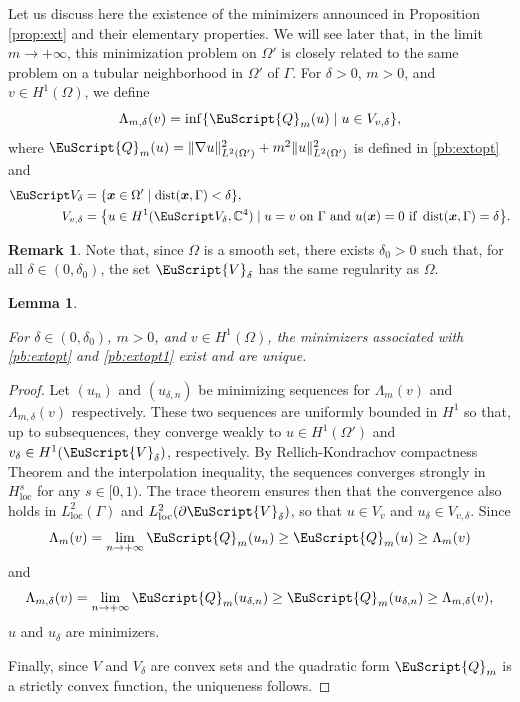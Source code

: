 \documentclass[JEP,XML,SOM,Unicode]{cedram}
\let\mathcal \EuScript
\newcommand{\cQ}{\mathcal{Q}}
\newcommand{\cV}{\mathcal{V}}
\DeclareMathOperator{\dist}{dist}
\newcommand{\loc}{\mathrm{loc}}
\let\sep\mid
\theoremstyle{plain}
\newtheorem{lemma}[theorem]{Lemma}
\theoremstyle{definition}
\newtheorem{remark}[theorem]{Remark}
\newcommand{\bx}{{\boldsymbol x}}
\begin{document}
Let us discuss here the existence of the minimizers announced in Proposition \ref{prop:ext} and their elementary properties. We will see later that, in the limit $m\to+\infty$, this minimization problem on $\Omega'$ is closely related to the same problem on a tubular neighborhood in $\Omega'$ of $\Gamma$. For $\delta>0$, $m>0$, and $v\in H^{1}(\Omega)$, we define
\begin{equation}\label{pb:extopt1}
\Lambda_{m,\delta}(v) = \inf\{
\cQ_{m}(u)\sep u\in V_{v,\delta}\},
\end{equation}
where $\cQ_m(u) = \|\nabla u\|^2_{L^2(\Omega')} + m^2\|u\|^2_{L^2(\Omega')}$
is defined in \eqref{pb:extopt}
and
\begin{equation*}
\begin{split} \mathcal V_{\delta} &= \{\bx\in\Omega'\sep\dist(\bx,\Gamma)<\delta\},\\
V_{v,\delta} &= \bigl\{
u\in H^1(\mathcal V_{\delta},\mathbb{C}^4) \sep u = v\mbox{ on }\Gamma\mbox{ and }u(\bx) =0\mbox{ if }\dist(\bx,\Gamma) = \delta
\bigr\}.
\end{split}
\end{equation*}

\begin{remark}\label{rem.regvoitub}
Note that, since $\Omega$ is a smooth set, there exists $\delta_0>0$ such that, for all $\delta\in(0,\delta_0)$, the set $\cV_\delta$ has the same regularity as $\Omega$.
\end{remark}


\begin{lemma}\label{lem.existence}

For $\delta\in(0,\delta_0)$, $m>0$, and $v\in H^1(\Omega)$,
the minimizers associated with \eqref{pb:extopt} and \eqref{pb:extopt1} exist and are unique.
\end{lemma}
\begin{proof}
Let $(u_n)$ and $(u_{\delta,n})$ be minimizing sequences for $\Lambda_{m}(v)$ and $\Lambda_{m,\delta}(v)$ respectively. These two sequences are uniformly bounded in $H^1$ so that, up to subsequences, they converge weakly to $u\in H^1(\Omega')$ and $v_\delta\in H^1(\cV_\delta)$, respectively. By Rellich-Kondrachov compactness Theorem and the interpolation inequality,
the sequences converges strongly in $H^{s}_\loc$ for any $s\in[0,1)$. The trace theorem ensures then that the convergence also holds in $L^2_\loc(\Gamma)$ and $L^2_\loc(\partial \cV_\delta)$, so that $u\in V_v$ and $u_\delta\in V_{v,\delta}$. Since
\[
\Lambda_m(v) = \lim_{n\to+\infty} \cQ_m(u_n)\geq \cQ_m(u)\geq \Lambda_m(v)
\]
and
\[
\Lambda_{m,\delta}(v) = \lim_{n\to+\infty} \cQ_{m}(u_{\delta,n})\geq \cQ_{m}(u_{\delta,n})\geq \Lambda_{m,\delta}(v),
\]
$u$ and $u_\delta$ are minimizers.

Finally, since $V$ and $V_\delta$ are convex sets and the quadratic form $\cQ_m$ is a strictly convex function, the uniqueness follows.
\end{proof}
\end{document}
